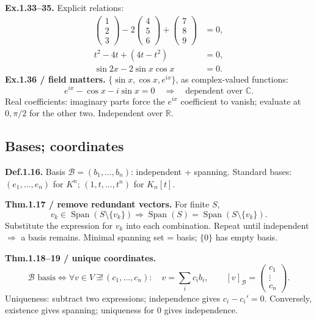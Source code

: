 \documentclass[11pt,letterpaper]{article}
\begin{document}
\textbf{Ex.1.33--35.} Explicit relations: \[
\begin{aligned}
\begin{pmatrix}1\\2\\3\end{pmatrix}
-2\begin{pmatrix}4\\5\\6\end{pmatrix}
+\begin{pmatrix}7\\8\\9\end{pmatrix}&=0,\\
t^2-4t+(4t-t^2)&=0,\\
\sin2x-2\sin x\cos x&=0.
\end{aligned}
\] \textbf{Ex.1.36 / field matters.} \(\{\sin x,\cos x,e^{ix}\}\), as
complex-valued functions: \[
e^{ix}-\cos x-i\sin x=0\quad\Rightarrow\quad\text{dependent over }\mathbb C.
\] Real coefficients: imaginary parts force the \(e^{ix}\) coefficient
to vanish; evaluate at \(0,\pi/2\) for the other two. Independent over
\(\mathbb R\).

\newpage

\subsection{Bases; coordinates}\label{bases-coordinates}

\textbf{Def.1.16.} Basis \(\mathcal B=(b_1,\ldots,b_n)\): independent +
spanning. Standard bases: \((e_1,\ldots,e_n)\) for \(K^n\);
\((1,t,\ldots,t^n)\) for \(K_n[t]\).

\textbf{Thm.1.17 / remove redundant vectors.} For finite \(S\), \[
v_k\in\operatorname{Span}(S\setminus\{v_k\})
\Rightarrow\operatorname{Span}(S)=\operatorname{Span}(S\setminus\{v_k\}).
\] Substitute the expression for \(v_k\) into each combination. Repeat
until independent \(\Rightarrow\) a basis remains. Minimal spanning set
= basis; \(\{0\}\) has empty basis.

\textbf{Thm.1.18--19 / unique coordinates.} \[
\mathcal B\text{ basis}\iff
\forall v\in V\ \exists!\,(c_1,\ldots,c_n):\quad v=\sum_i c_ib_i,
\qquad[v]_{\mathcal B}=\begin{pmatrix}c_1\\\vdots\\c_n\end{pmatrix}.
\] Uniqueness: subtract two expressions; independence gives
\(c_i-c_i'=0\). Conversely, existence gives spanning; uniqueness for
\(0\) gives independence.
\end{document}
